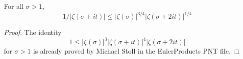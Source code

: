 \begin{lemma}[ZetaInvBound1]
\label{ZetaInvBound1}
\leanok
For all $\sigma>1$,
  $$
  1/|\zeta(\sigma+it)| \le |\zeta(\sigma)|^{3/4}|\zeta(\sigma+2it)|^{1/4}
  $$
\end{lemma}
\begin{proof}
\leanok
The identity
  $$
  1 \le |\zeta(\sigma)|^3 |\zeta(\sigma+it)|^4 |\zeta(\sigma+2it)|
  $$
  for $\sigma>1$
  is already proved by Michael Stoll in the EulerProducts PNT file.
\end{proof}
